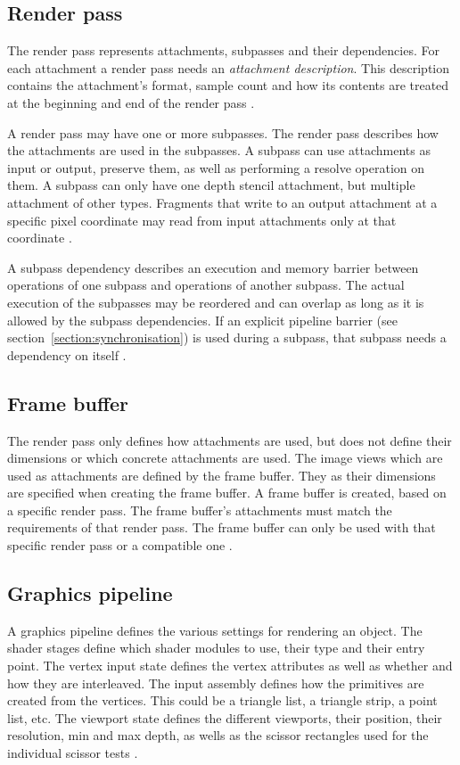 \subsection{Render pass}
\label{section:renderpass}


The render pass represents attachments, subpasses and their dependencies. For each attachment a render pass needs an \textit{attachment description}. This description contains the attachment's format, sample count and how its contents are treated at the beginning and end of the render pass \cite{khronos:vulkan:spec1.1}.

A render pass may have one or more subpasses. The render pass describes how the attachments are used in the subpasses. A subpass can use attachments as input or output, preserve them, as well as performing a resolve operation on them. A subpass can only have one depth stencil attachment, but multiple attachment of other types. Fragments that write to an output attachment at a specific pixel coordinate may read from input attachments only at that coordinate \cite{khronos:vulkan:spec1.1}.

A subpass dependency describes an execution and memory barrier between operations of one subpass and operations of another subpass. The actual execution of the subpasses may be reordered and can overlap as long as it is allowed by the subpass dependencies. If an explicit pipeline barrier (see section~\ref{section:synchronisation}) is used during a subpass, that subpass needs a dependency on itself \cite{khronos:vulkan:spec1.1}.

\subsection{Frame buffer}
The render pass only defines how attachments are used, but does not define their dimensions or which concrete attachments are used. The image views which are used as attachments are defined by the frame buffer. They as their dimensions are specified when creating the frame buffer. A frame buffer is created, based on a specific render pass. The frame buffer's attachments must match the requirements of that render pass. The frame buffer can only be used with that specific render pass or a compatible one \cite{khronos:vulkan:spec1.1}.


\subsection{Graphics pipeline}
A graphics pipeline defines the various settings for rendering an object. The shader stages define which shader modules to use, their type and their entry point. The vertex input state defines the vertex attributes as well as whether and how they are interleaved. The input assembly defines how the primitives are created from the vertices. This could be a triangle list, a triangle strip, a point list, etc. The viewport state defines the different viewports, their position, their resolution, min and max depth, as wells as the scissor rectangles used for the individual scissor tests \cite{khronos:vulkan:spec1.1}.

